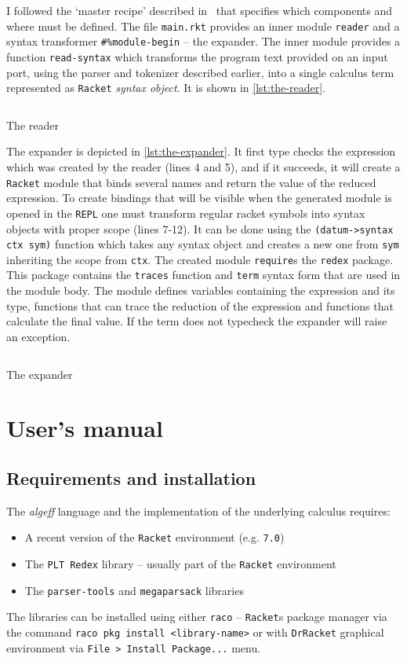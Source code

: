 \documentclass[inz, english, longabstract]{iithesis}
\newcommand{\Redex}{\texttt{PLT Redex}}
\newcommand{\Racket}{\texttt{Racket}}
\begin{document}
I followed the `master recipe' described in~\cite{BeautifulRacket} that specifies which components and where must be defined.
The file \texttt{main.rkt} provides an inner module \texttt{reader} and a syntax transformer \texttt{\#\%module-begin} -- the expander.
The inner module provides a function \texttt{read-syntax} which transforms the program text provided on an input port, using the parser and tokenizer described earlier, into a single calculus term represented as \Racket{} \emph{syntax object}.
It is shown in \autoref{lst:the-reader}.
\begin{listing}[t]
  \inputminted[firstline=11, lastline=19]{Racket}{../algeff/main.rkt}
  \caption{The reader}
  \label{lst:the-reader}
\end{listing}
The expander is depicted in \autoref{lst:the-expander}.
It first type checks the expression which was created by the reader (lines 4 and 5), and if it succeeds, it will create a \Racket{} module that binds several names and return the value of the reduced expression.
To create bindings that will be visible when the generated module is opened in the \texttt{REPL} one must transform regular racket symbols into syntax objects with proper scope (lines 7-12).
It can be done using the \texttt{(datum->syntax ctx sym)} function which takes any syntax object and creates a new one from \texttt{sym} inheriting the scope from \texttt{ctx}.
The created module \texttt{require}s the \texttt{redex} package.
This package contains the \texttt{traces} function and \texttt{term} syntax form that are used in the module body.
The module defines variables containing the expression and its type, functions that can trace the reduction of the expression and functions that calculate the final value.
If the term does not typecheck the expander will raise an exception.
\begin{listing}[t]
  \inputminted[firstline=29,linenos=true,firstnumber=1,lastline=56]{Racket}{../algeff/main.rkt}
  \caption{The expander}
  \label{lst:the-expander}
\end{listing}

\chapter{User's manual}\label{ch:manual}
\section{Requirements and installation}
The \emph{algeff} language and the implementation of the underlying calculus requires:
\begin{itemize}
  \item A recent version of the \Racket{} environment (e.g. \texttt{7.0})
  \item The \Redex{} library -- usually part of the \Racket{} environment
  \item The \texttt{parser-tools} and \texttt{megaparsack} libraries
\end{itemize}
The libraries can be installed using either \texttt{raco} -- \Racket{}s package manager via the command \texttt{raco pkg install <library-name>} or with \texttt{DrRacket} graphical environment via \texttt{File > Install Package...} menu.
\end{document}
